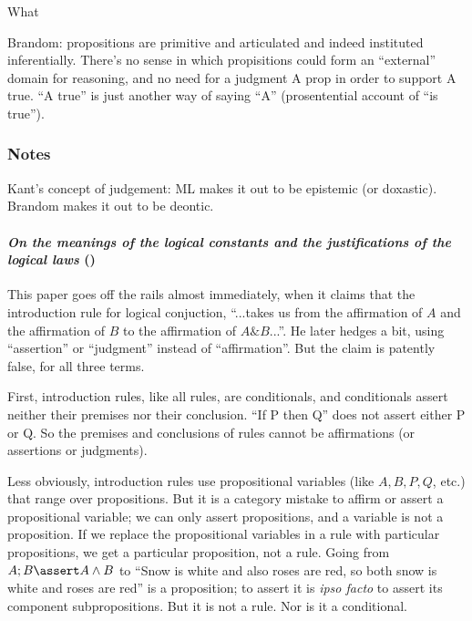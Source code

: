 \documentclass{article}
\begin{document}
What

Brandom: propositions are primitive and articulated and indeed
instituted inferentially. There's no sense in which propisitions could
form an ``external'' domain for reasoning, and no need for a judgment
A prop in order to support A true. ``A true'' is just another way of
saying ``A'' (prosentential account of ``is true'').

\subsubsection{Notes}

Kant's concept of judgement: ML makes it out to be epistemic (or
doxastic). Brandom makes it out to be deontic.

\paragraph{\textit{On the meanings of the logical constants and the justifications of the logical laws} (\parencite{martin1996meanings})
  \newline}

This paper goes off the rails almost immediately, when it claims that
the introduction rule for logical conjuction,
``...takes us from the affirmation of \(A\) and the affirmation of \(B\) to
the affirmation of \(A\&B\)...''. He later hedges a bit, using
``assertion'' or ``judgment'' instead of ``affirmation''. But the
claim is patently false, for all three terms.

First, introduction rules, like all rules, are conditionals, and
conditionals assert neither their premises nor their conclusion. ``If
P then Q'' does not assert either P or Q. So the premises and
conclusions of rules cannot be affirmations (or assertions or
judgments).

Less obviously, introduction rules use propositional variables (like
\(A, B, P, Q\), etc.) that range over propositions. But it is a
category mistake to affirm or assert a propositional variable; we can
only assert propositions, and a variable is not a proposition. If
we replace the propositional variables in a rule with particular
propositions, we get a particular proposition, not a rule. Going from
\(A; B \linfer A\land B\) to ``Snow is white and also roses are red, so
both snow is white and roses are red'' is a proposition; to assert it
is \textit{ipso facto} to assert its component subpropositions. But it
is not a rule.  Nor is it a conditional.
\end{document}
